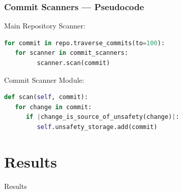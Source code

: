 \documentclass[notes,aspectratio=169]{beamer}
\makeatletter
\newcommand{\timer}[1]{\note{S:\@#1:00\\}}
\makeatother
\begin{document}
\begin{frame}[fragile]
   \frametitle{Commit Scanners --- Pseudocode}
   Main Repository Scanner:
   \begin{lstlisting}[frame=tlrb, language=Python]
for commit in repo.traverse_commits(to=100):
   for scanner in commit_scanners:
         scanner.scan(commit)
   \end{lstlisting}
   \vspace{1em}
   Commit Scanner Module:
   \begin{lstlisting}[frame=tlrb, language=Python, style=highlight]
def scan(self, commit):
   for change in commit:
      if |change_is_source_of_unsafety(change)|:
         self.unsafety_storage.add(commit)
   \end{lstlisting}
\end{frame}

\section{Results}

\begin{frame}
   \centering\Huge
   Results
   \timer{17}
\end{frame}
\end{document}
